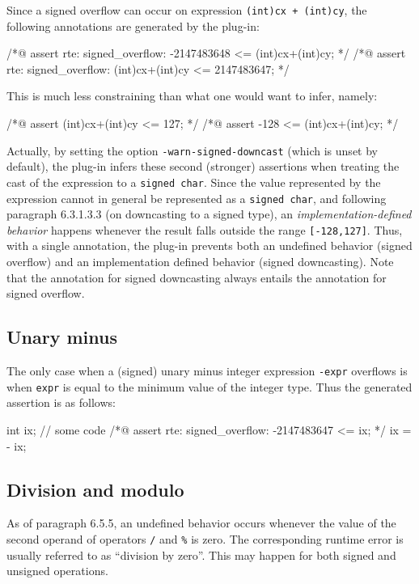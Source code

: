 Since a signed overflow can occur on expression \lstinline|(int)cx + (int)cy|,
the following annotations are generated by the \rte{} plug-in:
\begin{listing-nonumber}
/*@ assert rte: signed_overflow: -2147483648 <= (int)cx+(int)cy; */
/*@ assert rte: signed_overflow: (int)cx+(int)cy <= 2147483647; */
\end{listing-nonumber}

This is much less constraining than what one would want to infer, namely:
\begin{listing-nonumber}
/*@ assert (int)cx+(int)cy <= 127; */
/*@ assert -128 <= (int)cx+(int)cy; */
\end{listing-nonumber}

Actually, by setting the option \texttt{-warn-signed-downcast} (which is unset
by default), the \rte{} plug-in infers these second (stronger) assertions when
treating the cast of the expression to a \lstinline|signed char|.  Since the
value represented by the expression cannot in general be represented as a
\lstinline|signed char|, and following \cnn{} paragraph \mbox{6.3.1.3.3} (on
downcasting to a signed type), an {\it implementation-defined behavior} happens
whenever the result falls outside the range \lstinline|[-128,127]|.  Thus, with
a single annotation, the \rte{} plug-in prevents both an undefined behavior
(signed overflow) and an implementation defined behavior (signed downcasting).
Note that the annotation for signed downcasting always entails the annotation
for signed overflow.

\subsection{Unary minus}

The only case when a (signed) unary minus integer expression \lstinline|-expr|
overflows is when \lstinline|expr| is equal to the minimum value of the integer
type. Thus the generated assertion is as follows:
\begin{listing-nonumber}
int ix;
// some code
/*@ assert rte: signed_overflow: -2147483647 <= ix; */
ix = - ix;
\end{listing-nonumber}

\subsection{Division and modulo}

As of \cnn{} paragraph \mbox{6.5.5}, an undefined behavior occurs whenever the
value of the second operand of operators \lstinline|/| and \lstinline|%| is
zero. The corresponding runtime error is usually referred to as ``division by
zero''.  This may happen for both signed and unsigned operations.

